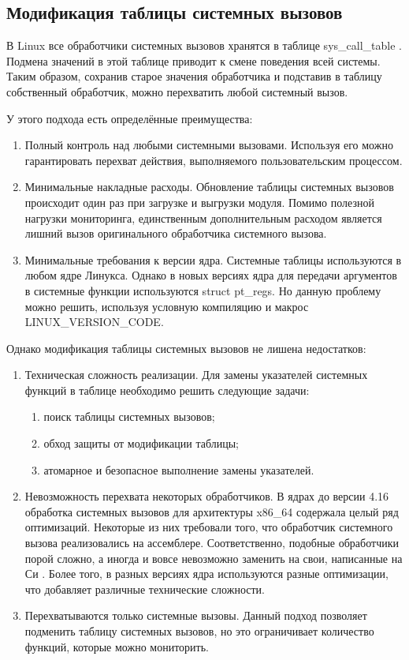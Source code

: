 	\subsection*{Модификация таблицы системных вызовов}
		В Linux все обработчики системных вызовов хранятся в таблице sys\_call\_table \cite{linux-syscall-reference}.
		Подмена значений в этой таблице приводит к смене поведения всей системы. 
		Таким образом, сохранив старое значения обработчика и подставив в таблицу собственный обработчик, 
		можно перехватить любой системный вызов.

		У этого подхода есть определённые преимущества:
		\begin{enumerate}
			\item Полный контроль над любыми системными вызовами.
				Используя его можно гарантировать перехват действия,
				выполняемого пользовательским процессом.
			\item Минимальные накладные расходы.
				Обновление таблицы системных вызовов происходит один раз при загрузке и выгрузки модуля.
				Помимо полезной нагрузки мониторинга, единственным дополнительным расходом является лишний вызов 
				оригинального обработчика системного вызова.
			\item Минимальные требования к версии ядра.
				Системные таблицы используются в любом ядре Линукса. 
				Однако в новых версиях ядра для передачи аргументов в системные функции
				используются struct pt\_regs. 
				Но данную проблему можно решить, используя условную компиляцию и макрос LINUX\_VERSION\_CODE.
		\end{enumerate}
		
		Однако модификация таблицы системных вызовов не лишена недостатков:
		\begin{enumerate}
			\item Техническая сложность реализации.
				Для замены указателей системных функций в таблице необходимо решить следующие задачи:
				\begin{enumerate}
					\item поиск таблицы системных вызовов;
					\item обход защиты от модификации таблицы;
					\item атомарное и безопасное выполнение замены указателей.
				\end{enumerate}
			
			\item Невозможность перехвата некоторых обработчиков. 
				В ядрах до версии 4.16 обработка системных вызовов для архитектуры x86\_64 содержала целый ряд оптимизаций.
				Некоторые из них требовали того, что обработчик системного вызова реализовались на ассемблере. 
				Соответственно, подобные обработчики порой сложно, а иногда и вовсе невозможно заменить на свои, написанные на Си \cite{habr-ftrace}.
				Более того, в разных версиях ядра используются разные оптимизации, что добавляет различные технические сложности.

			\item Перехватываются только системные вызовы.
				Данный подход позволяет подменить таблицу системных вызовов,
				но это ограничивает количество функций, которые можно мониторить.
		\end{enumerate}
	
